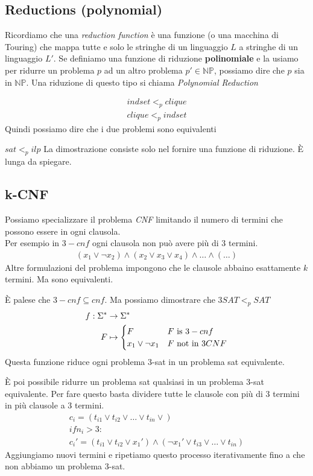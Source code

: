 \documentclass{article}
\begin{document}
\subsection{Reductions (polynomial)}
Ricordiamo che una \textit{reduction function} è una funzione (o una macchina di Touring) che mappa tutte e solo le stringhe di un linguaggio $L$ a stringhe di un linguaggio $L'$.
Se definiamo una funzione di riduzione \textbf{polinomiale} e la usiamo per ridurre un problema $p$ ad un altro problema $p'\in\mathbb{NP}$, possiamo dire che $p$ sia in $\mathbb{NP}$.
Una riduzione di questo tipo si chiama \textit{Polynomial Reduction}

\begin{align*}
    indset <_p clique \\
    clique <_p indset
\end{align*}
Quindi possiamo dire che i due problemi sono equivalenti

\begin{callout}{$sat<_p ilp$}
    La dimostrazione consiste solo nel fornire una funzione di riduzione. È lunga da spiegare.
\end{callout}

\subsection{k-CNF}
Possiamo specializzare il problema \textit{CNF} limitando il numero di termini che possono essere in ogni clausola. \\
Per esempio in $3-cnf$ ogni clausola non può avere più di $3$ termini.
\begin{gather*}
    (x_1\vee \neg x_2) \wedge (x_2\vee x_3\vee x_4) \wedge \dots \wedge (\dots)
\end{gather*}
Altre formulazioni del problema impongono che le clausole abbaino esattamente $k$ termini. Ma sono equivalenti.

È palese che $3-cnf \subseteq cnf$. Ma possiamo dimostrare che $3SAT<_p SAT$
\begin{align*}
    f:\Sigma^* &\to \Sigma^* \\
    F&\mapsto\begin{cases}
        F & F\text{ is } 3-cnf \\
        x_1\vee \neg x_1 & F\text{ not in } 3CNF
    \end{cases}
\end{align*}
Questa funzione riduce ogni problema 3-sat in un problema sat equivalente.

È poi possibile ridurre un problema sat qualsiasi in un problema 3-sat equivalente. Per fare questo basta dividere tutte le clausole con più di 3 termini in più clausole a 3 termini.
\begin{gather*}
    c_i = (t_{i1} \vee t_{i2} \vee \dots \vee t_{in} \vee) \\
    if n_i>3: \\
    c_i' = (t_{i1}\vee t_{i2} \vee x_1') \wedge (\neg x_1' \vee t_{i3}\vee \dots \vee t_{in})
\end{gather*}
Aggiungiamo nuovi termini e ripetiamo questo processo iterativamente fino a che non abbiamo un problema 3-sat.
\end{document}
